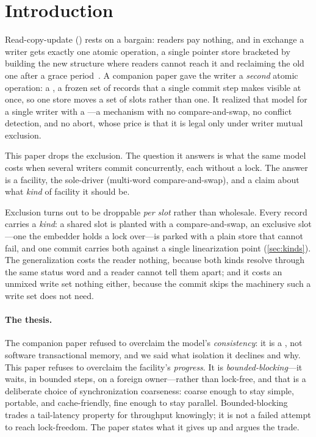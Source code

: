 \documentclass[11pt]{article}
\begin{document}
\section{Introduction}
\label{sec:intro}

Read-copy-update (\rcu) rests on a bargain: readers pay nothing, and in exchange a
writer gets exactly one atomic operation, a single pointer store bracketed by building
the new structure where readers cannot reach it and reclaiming the old one after
a grace period~\citep{mckenney1998rcu, desnoyers2012urcu}. A companion paper
gave the \rcu writer a \emph{second} atomic operation: a \pseudotxn, a frozen set of
 records that a single commit step makes visible at once,
so one store moves a set of slots rather than one. It realized that model for a
single writer with a \fliplatch---a mechanism with no compare-and-swap, no
conflict detection, and no abort, whose price is that it is legal only under
writer mutual exclusion.

This paper drops the exclusion. The question it answers is what the same model
costs when several writers commit concurrently, each without a lock. The answer
is a facility, the sole-driver \mcas (multi-word compare-and-swap), and a claim
about what \emph{kind} of facility it should be.

Exclusion turns out to be droppable \emph{per slot} rather than wholesale. Every
record carries a \emph{kind}: a shared slot is planted with a compare-and-swap,
an exclusive slot---one the embedder holds a lock over---is parked with a plain
store that cannot fail, and one commit carries both against a single
linearization point (\cref{sec:kinds}). The generalization costs the reader
nothing, because both kinds resolve through the same status word and a reader
cannot tell them apart; and it costs an unmixed write set nothing either,
because the commit skips the machinery such a write set does not need.

\paragraph{The thesis.} The companion paper refused to overclaim the model's
\emph{consistency}: it is a \pseudotxn, not software transactional memory, and
we said what isolation it declines and why. This paper refuses to overclaim the
facility's \emph{progress}. It is \emph{bounded-blocking}---it waits, in bounded
steps, on a foreign owner---rather than lock-free, and that is a deliberate
choice of synchronization coarseness: coarse enough to stay simple, portable,
and cache-friendly, fine enough to stay parallel. Bounded-blocking trades a
tail-latency property for throughput knowingly; it is not a failed attempt to
reach lock-freedom. The paper states what it gives up and argues the trade.
\end{document}
